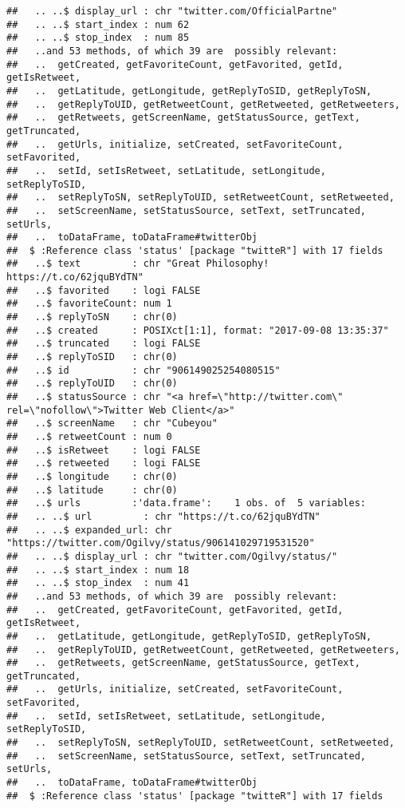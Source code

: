 \documentclass[]{article}
\begin{document}
\begin{verbatim}
##   .. ..$ display_url : chr "twitter.com/OfficialPartne"
##   .. ..$ start_index : num 62
##   .. ..$ stop_index  : num 85
##   ..and 53 methods, of which 39 are  possibly relevant:
##   ..  getCreated, getFavoriteCount, getFavorited, getId, getIsRetweet,
##   ..  getLatitude, getLongitude, getReplyToSID, getReplyToSN,
##   ..  getReplyToUID, getRetweetCount, getRetweeted, getRetweeters,
##   ..  getRetweets, getScreenName, getStatusSource, getText, getTruncated,
##   ..  getUrls, initialize, setCreated, setFavoriteCount, setFavorited,
##   ..  setId, setIsRetweet, setLatitude, setLongitude, setReplyToSID,
##   ..  setReplyToSN, setReplyToUID, setRetweetCount, setRetweeted,
##   ..  setScreenName, setStatusSource, setText, setTruncated, setUrls,
##   ..  toDataFrame, toDataFrame#twitterObj
##  $ :Reference class 'status' [package "twitteR"] with 17 fields
##   ..$ text         : chr "Great Philosophy! https://t.co/62jquBYdTN"
##   ..$ favorited    : logi FALSE
##   ..$ favoriteCount: num 1
##   ..$ replyToSN    : chr(0) 
##   ..$ created      : POSIXct[1:1], format: "2017-09-08 13:35:37"
##   ..$ truncated    : logi FALSE
##   ..$ replyToSID   : chr(0) 
##   ..$ id           : chr "906149025254080515"
##   ..$ replyToUID   : chr(0) 
##   ..$ statusSource : chr "<a href=\"http://twitter.com\" rel=\"nofollow\">Twitter Web Client</a>"
##   ..$ screenName   : chr "Cubeyou"
##   ..$ retweetCount : num 0
##   ..$ isRetweet    : logi FALSE
##   ..$ retweeted    : logi FALSE
##   ..$ longitude    : chr(0) 
##   ..$ latitude     : chr(0) 
##   ..$ urls         :'data.frame':    1 obs. of  5 variables:
##   .. ..$ url         : chr "https://t.co/62jquBYdTN"
##   .. ..$ expanded_url: chr "https://twitter.com/Ogilvy/status/906141029719531520"
##   .. ..$ display_url : chr "twitter.com/Ogilvy/status/"
##   .. ..$ start_index : num 18
##   .. ..$ stop_index  : num 41
##   ..and 53 methods, of which 39 are  possibly relevant:
##   ..  getCreated, getFavoriteCount, getFavorited, getId, getIsRetweet,
##   ..  getLatitude, getLongitude, getReplyToSID, getReplyToSN,
##   ..  getReplyToUID, getRetweetCount, getRetweeted, getRetweeters,
##   ..  getRetweets, getScreenName, getStatusSource, getText, getTruncated,
##   ..  getUrls, initialize, setCreated, setFavoriteCount, setFavorited,
##   ..  setId, setIsRetweet, setLatitude, setLongitude, setReplyToSID,
##   ..  setReplyToSN, setReplyToUID, setRetweetCount, setRetweeted,
##   ..  setScreenName, setStatusSource, setText, setTruncated, setUrls,
##   ..  toDataFrame, toDataFrame#twitterObj
##  $ :Reference class 'status' [package "twitteR"] with 17 fields

\end{verbatim}
\end{document}
